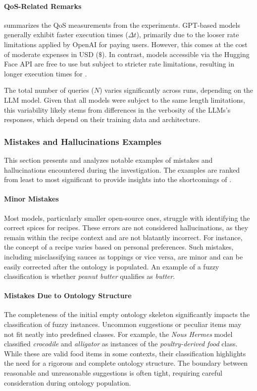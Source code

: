 \paragraph{\Gls{QoS}-Related Remarks}
%

%
 summarizes the \gls{QoS} measurements from the experiments.
%
GPT-based models generally exhibit faster execution times (\(\Delta t\)), primarily due to the looser rate limitations applied by OpenAI for paying users.
%
However, this comes at the cost of moderate expenses in USD (\(\$\)).
%
In contrast, models accessible via the Hugging Face API are free to use but subject to stricter rate limitations, resulting in longer execution times for \llmfkg{}.

The total number of queries (\(N\)) varies significantly across runs, depending on the \gls{LLM} model.
%
Given that all models were subject to the same length limitations, this variability likely stems from differences in the verbosity of the \glspl{LLM}'s responses, which depend on their training data and architecture.

\subsubsection{Mistakes and Hallucinations Examples}
\label{subsubsec:interesting_samples}
%
This section presents and analyzes notable examples of mistakes and hallucinations encountered during the investigation.
%
The examples are ranked from least to most significant to provide insights into the shortcomings of \llmfkg{}.

\paragraph{Minor Mistakes}
%
Most models, particularly smaller open-source ones, struggle with identifying the correct spices for recipes.
%
These errors are not considered hallucinations, as they remain within the recipe context and are not blatantly incorrect.
%
For instance, the concept of a recipe varies based on personal preferences.
%
Such mistakes, including misclassifying sauces as toppings or vice versa, are minor and can be easily corrected after the ontology is populated.
%
An example of a fuzzy classification is whether \emph{peanut butter} qualifies as \emph{butter}.

\paragraph{Mistakes Due to Ontology Structure}
%
The completeness of the initial empty ontology skeleton significantly impacts the classification of fuzzy instances.
%
Uncommon suggestions or peculiar items may not fit neatly into predefined classes.
%
For example, the \emph{Nous Hermes} model classified \emph{crocodile} and \emph{alligator} as instances of the \emph{poultry-derived food} class.
%
While these are valid food items in some contexts, their classification highlights the need for a rigorous and complete ontology structure.
%
The boundary between reasonable and unreasonable suggestions is often tight, requiring careful consideration during ontology population.

